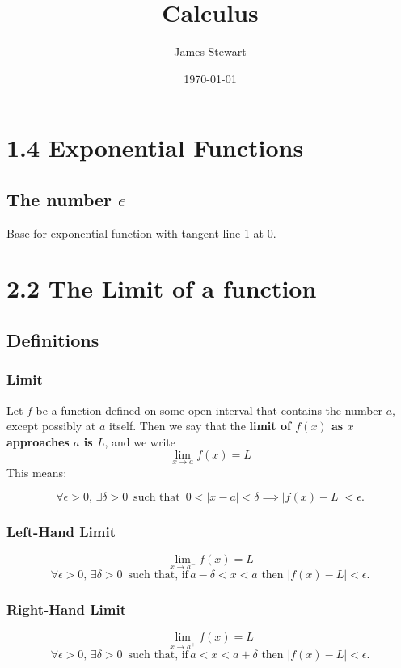 \documentclass{article}
\title{Calculus}
\author{James Stewart}
\date{\today}
\begin{document}
\maketitle %

\section*{1.4 Exponential Functions}
\subsection*{The number \( e \)}
Base for exponential function with tangent line 1 at 0.

\section*{2.2 The Limit of a function}
\subsection*{Definitions}
\subsubsection*{Limit} 
Let \(f\) be a function defined on some open interval that contains the number \(a\), except possibly at \(a\) itself. Then we say that
the \textbf{limit of \( f(x) \) as \(x\) approaches \(a\) is \(L\)}, and we write
\[
\lim_{x \to a} f(x) = L
\]
This means:

\[
\forall \epsilon > 0, \, \exists \delta > 0 \, \text{ such that } \, 0 < |x - a| < \delta \implies |f(x) - L| < \epsilon.
\]

\subsubsection*{Left-Hand Limit} 
\[
\lim_{x \to a^-} f(x) = L
\]
\[
\forall \epsilon > 0, \, \exists \delta > 0 \, \text{ such that, if} \, a - \delta < x < a \text{ then } |f(x) - L| < \epsilon.
\]

\subsubsection*{Right-Hand Limit} 
\[
\lim_{x \to a^+} f(x) = L
\]
\[
\forall \epsilon > 0, \, \exists \delta > 0 \, \text{ such that, if} \, a < x < a + \delta \text{ then } |f(x) - L| < \epsilon.
\]
\end{document}
